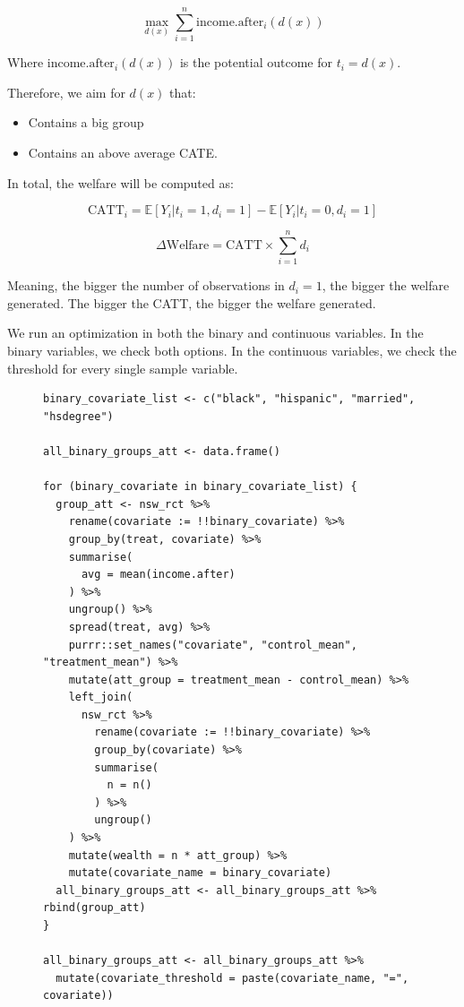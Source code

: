 \documentclass{article}
\begin{document}
$$
\max_{d(x)} \sum_{i = 1}^{n} \text{income.after}_i(d(x))
$$

Where $\text{income.after}_i(d(x))$ is the potential outcome for $t_i = d(x)$.

Therefore, we aim for $d(x)$ that:
\begin{itemize}
    \item Contains a big group
    \item Contains an above average CATE.
\end{itemize}

In total, the welfare will be computed as:

$$
\text{CATT}_i = \mathbb{E}[Y_i | t_i = 1, d_i = 1] - \mathbb{E}[Y_i | t_i = 0, d_i = 1]
$$

$$
\Delta \text{Welfare} = \text{CATT} \times \sum_{i = 1}^{n} d_i
$$

Meaning, the bigger the number of observations in $d_i = 1$, the bigger the welfare generated. The bigger the CATT, the bigger the welfare generated.

We run an optimization in both the binary and continuous variables. In the binary variables, we check both options. In the continuous variables, we check the threshold for every single sample variable.

\begin{figure}[H]
\centering
\begin{lstlisting}[style=Rstyle, caption=Binary Threshold Search]
binary_covariate_list <- c("black", "hispanic", "married", "hsdegree")

all_binary_groups_att <- data.frame()

for (binary_covariate in binary_covariate_list) {
  group_att <- nsw_rct %>%
    rename(covariate := !!binary_covariate) %>% 
    group_by(treat, covariate) %>% 
    summarise(
      avg = mean(income.after)
    ) %>% 
    ungroup() %>% 
    spread(treat, avg) %>% 
    purrr::set_names("covariate", "control_mean", "treatment_mean") %>% 
    mutate(att_group = treatment_mean - control_mean) %>% 
    left_join(
      nsw_rct %>% 
        rename(covariate := !!binary_covariate) %>% 
        group_by(covariate) %>% 
        summarise(
          n = n()
        ) %>% 
        ungroup()
    ) %>% 
    mutate(wealth = n * att_group) %>% 
    mutate(covariate_name = binary_covariate)
  all_binary_groups_att <- all_binary_groups_att %>% rbind(group_att)
}

all_binary_groups_att <- all_binary_groups_att %>% 
  mutate(covariate_threshold = paste(covariate_name, "=", covariate))

\end{lstlisting}
\end{figure}
\end{document}
